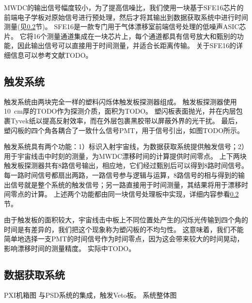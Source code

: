 MWDC的输出信号幅度较小，为了提高信噪比，我们使用一块基于SFE16芯片的前端电子学板对原始信号进行预处理，然后才将其输出到数据获取系统中进行时间测量(见\ref{sec:cosmic_ray:daq_system}节)。
SFE16是一款专门用于气体漂移室前端信号处理的低噪声ASIC芯片。
它将16个测量通道集成在一块芯片上，每个通道都具有信号放大和甄别的功能，因此输出信号可以直接用于时间测量，并适合长距离传输。
关于SFE16的详细信息可以参考文献TODO。

\subsection{触发系统}
\label{sec:cosmic_ray:triggering_system}
触发系统由两块完全一样的塑料闪烁体触发板探测器组成。
触发板探测器使用\SI{10}{cm}厚的TODO作为探测介质，面积为TODO。
塑闪板表面抛光，并在内层包裹Tyvek纸以提高反射效率，而在外层包裹黑胶带以屏蔽外界的光干扰。
最后，塑闪板的四个角各耦合了一致什么信号PMT，用于信号引出，如图TODO所示。

触发系统具有两个功能：1）标识入射宇宙线，为数据获取系统提供触发信号；2）用于宇宙线击中时刻的测量，为MWDC漂移时间的计算提供时间零点。
上下两块触发板探测器共有8路信号输出，相应地，它们经过甄别后可以得到8路时间信号。
每一路时间信号都扇出两路，一路信号参与逻辑与运算，8路信号的相与得到的输出信号就是整个系统的触发信号；另一路直接用于时间测量，其结果将用于漂移时间零点的计算。
上述两个功能都由同一块信号处理板中实现，详细内容参看\ref{sec:cosmic_ray:daq_system}节。

由于触发板的面积较大，宇宙线击中板上不同位置处产生的闪烁光传输到四个角的时间是有差异的，我们把这个现象称为塑闪板的不均匀性。
这意味着，我们不能简单地选择一支PMT的时间信号作为时间零点，因为这会带来较大的时间晃动，影响漂移时间的测量精度。
实际中TODO。

\subsection{数据获取系统}
\label{sec:cosmic_ray:daq_system}
PXI机箱图
与PSD系统的集成，触发Veto板。
系统整体图

